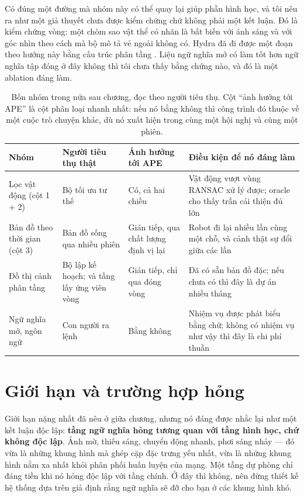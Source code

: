 \documentclass[../../deep_learning.tex]{subfiles}
\begin{document}
Có đúng một đường mà nhóm này có thể quay lại giúp phần hình học, và tôi nêu ra như một giả thuyết chưa được kiểm chứng chứ không phải một kết luận. Đó là kiểm chứng vòng: một chòm sao vật thể có nhãn là bất biến với ánh sáng và với góc nhìn theo cách mà bộ mô tả vẻ ngoài không có. Hydra đã đi được một đoạn theo hướng này bằng cấu trúc phân tầng \cite{hughes2022hydra}. Liệu ngữ nghĩa mở có làm tốt hơn ngữ nghĩa tập đóng ở đây không thì tôi chưa thấy bằng chứng nào, và đó là một ablation đáng làm.

\begin{table}[H]\centering\footnotesize
\caption{Bốn nhóm trong nửa sau chương, đọc theo người tiêu thụ. Cột ``ảnh hưởng tới APE'' là cột phân loại nhanh nhất: nếu nó bằng không thì công trình đó thuộc về một cuộc trò chuyện khác, dù nó xuất hiện trong cùng một hội nghị và cùng một phiên.}
\label{tab:f33-ai-dung}
\begin{tabularx}{\linewidth}{@{}L{2.9cm}L{3.3cm}L{2.4cm}Y@{}}
\toprule
\textbf{Nhóm} & \textbf{Người tiêu thụ thật} & \textbf{Ảnh hưởng tới APE} & \textbf{Điều kiện để nó đáng làm}\\
\midrule
Lọc vật động (cột 1 + 2) & Bộ tối ưu tư thế & Có, cả hai chiều & Vật động vượt vùng RANSAC xử lý được; oracle cho thấy trần cải thiện đủ lớn\\
Bản đồ theo thời gian (cột 3) & Bản đồ sống qua nhiều phiên & Gián tiếp, qua chất lượng định vị lại & Robot đi lại nhiều lần cùng một chỗ, và cảnh thật sự đổi giữa các lần\\
Đồ thị cảnh phân tầng & Bộ lập kế hoạch; và tầng lấy ứng viên vòng & Gián tiếp, chỉ qua đóng vòng & Đã có sẵn bản đồ đặc; nếu chưa có thì đây là dự án nhiều tháng\\
Ngữ nghĩa mở, ngôn ngữ & Con người ra lệnh & Bằng không & Nhiệm vụ được phát biểu bằng chữ; không có nhiệm vụ như vậy thì đây là chi phí thuần\\
\bottomrule
\end{tabularx}
\end{table}

\section{Giới hạn và trường hợp hỏng}
Giới hạn nặng nhất đã nêu ở giữa chương, nhưng nó đáng được nhắc lại như một kết luận độc lập: \textbf{tầng ngữ nghĩa hỏng tương quan với tầng hình học, chứ không độc lập}. Ảnh mờ, thiếu sáng, chuyển động nhanh, phơi sáng nhảy --- đó vừa là những khung hình mà ghép cặp đặc trưng yếu nhất, vừa là những khung hình nằm xa nhất khỏi phân phối huấn luyện của mạng. Một tầng dự phòng chỉ đáng tiền khi nó hỏng độc lập với tầng chính. Ở đây thì không, nên đừng thiết kế hệ thống dựa trên giả định rằng ngữ nghĩa sẽ đỡ cho bạn ở các khung hình khó.
\end{document}
